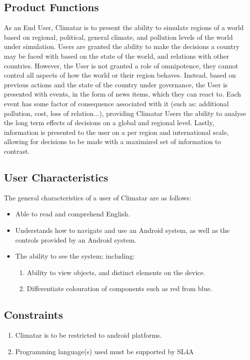 \documentclass[]{article}
\begin{document}
\subsection{Product Functions}
\label{sub:product_functions}
As an End User, Climatar is to present the ability to simulate regions of a world based on regional, political, general climate, and pollution levels of the world under simulation.  Users are granted the ability to make the decisions a country may be faced with based on the state of the world, and relations with other countries. However, the User is not granted a role of omnipotence, they cannot control all aspects of how the world or their region behaves. Instead, based on previous actions and the state of the country under governance, the User is presented with events, in the form of news items, which they can react to. Each event has some factor of consequence associated with it (such as: additional pollution, cost, loss of relation...), providing Climatar Users the ability to analyse the long term effects of decisions on a global and regional level. Lastly, information is presented to the user on a per region and international scale, allowing for decisions to be made with a maximized set of information to contrast.

\subsection{User Characteristics}
\label{sub:user_characteristics}
The general characteristics of a user of Climatar are as follows:
\begin{itemize}
	\item Able to read and comprehend English.
	\item Understands how to navigate and use an Android system, as 	well as the controls provided by an Android system.
	\item The ability to see the system; including:
	\begin{enumerate}[-]
		\item Ability to view objects, and distinct elements on the device.
		\item Differentiate colouration of components such as red from blue.
	\end{enumerate}
\end{itemize}

\subsection{Constraints}
\label{sub:constraints}
\begin{enumerate}
	\item Climatar is to be restricted to android platforms.
	\item Programming language(s) used must be supported by SL4A
\end{enumerate}
\end{document}
